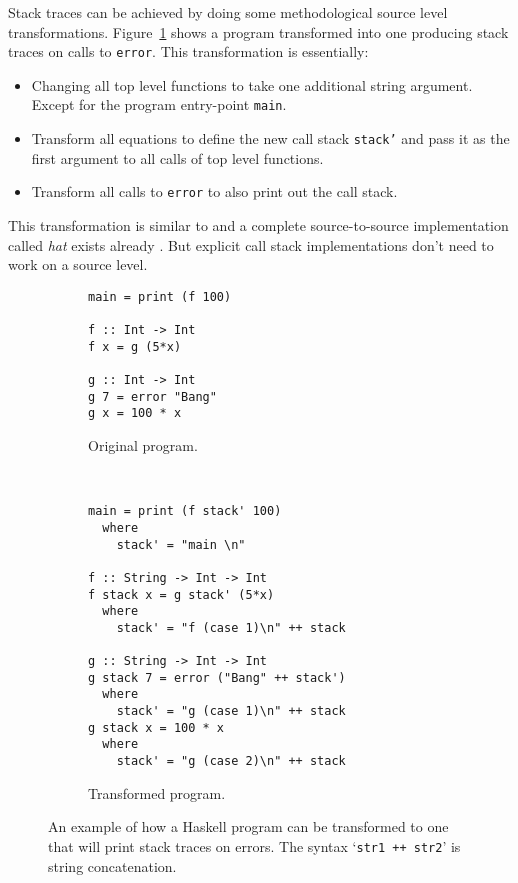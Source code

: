 Stack traces can be achieved by doing some methodological source level
transformations. Figure~\ref{fig:transformation} shows a program transformed
into one producing stack traces on calls to \texttt{error}. This transformation is essentially:

\begin{itemize}
\itemsep1pt\parskip0pt
\item
  Changing all top level functions to take one additional string
  argument. Except for the program entry-point \texttt{main}.
\item
  Transform all equations to define the new call stack \texttt{stack'} and
  pass it as the first argument to all calls of top level functions.
\item
  Transform all calls to \texttt{error} to also print out the call stack.
\end{itemize}

This transformation is similar to \cite{source_transformation} and a
complete source-to-source implementation called \emph{hat} exists already
\cite{hat_website}. But explicit call stack implementations don't need
to work on a source level.

\begin{figure}
\begin{mdframed}
        \begin{subfigure}[t]{0.4\textwidth}
            \begin{verbatim}
main = print (f 100)

f :: Int -> Int
f x = g (5*x)

g :: Int -> Int
g 7 = error "Bang"
g x = 100 * x
            \end{verbatim}
            \caption{Original program.}
        \end{subfigure}
        ~ %
        \begin{subfigure}[t]{0.6\textwidth}
          \begin{verbatim}
main = print (f stack' 100)
  where
    stack' = "main \n"

f :: String -> Int -> Int
f stack x = g stack' (5*x)
  where
    stack' = "f (case 1)\n" ++ stack

g :: String -> Int -> Int
g stack 7 = error ("Bang" ++ stack')
  where
    stack' = "g (case 1)\n" ++ stack
g stack x = 100 * x
  where
    stack' = "g (case 2)\n" ++ stack
          \end{verbatim}
          \caption{Transformed program.}
        \end{subfigure}
        \caption{An example of how a Haskell program can be transformed to one
          that will print stack traces on errors. The syntax `\texttt{str1 ++
            str2}' is string concatenation.}
        \label{fig:transformation}
\end{mdframed}
\end{figure}

